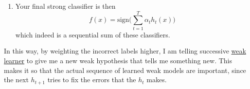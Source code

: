 \begin{definition}
\begin{enumerate}
\begin{enumerate}
          \item Then we set 
            \begin{equation}
              W_{t + 1} (i) \propto W_t (i) \, \exp\{ - \alpha_t y_i h_t (x_i) \} = \begin{cases} 
                e^{-\alpha_t} & \text{ if } h_t(x_i) = y_i\\  
                e^{+\alpha_t} & \text{ if } h_t (x_i) \neq y_i
              \end{cases}
            \end{equation}
            meaning that the new weights go up for incorrect labels and down for correct labels. We show proportional to since it is not normalized, but we can normalize it with the constant $Z_t$. 
        \end{enumerate}

      \item Your final strong classifier is then 
        \begin{equation}
          f(x) = \mathrm{sign} \bigg( \sum_{t=1}^T \alpha_t h_t(x) \bigg)
        \end{equation}
        which indeed is a sequential sum of these classifiers. 
    \end{enumerate}
  \end{definition}

  In this way, by weighting the incorrect labels higher, I am telling successive \hyperref[def:weak-learner]{weak learner} to give me a new weak hypothesis that tells me something new. This makes it so that the actual sequence of learned weak models are important, since the next $h_{t+1}$ tries to fix the errors that the $h_t$ makes. 

